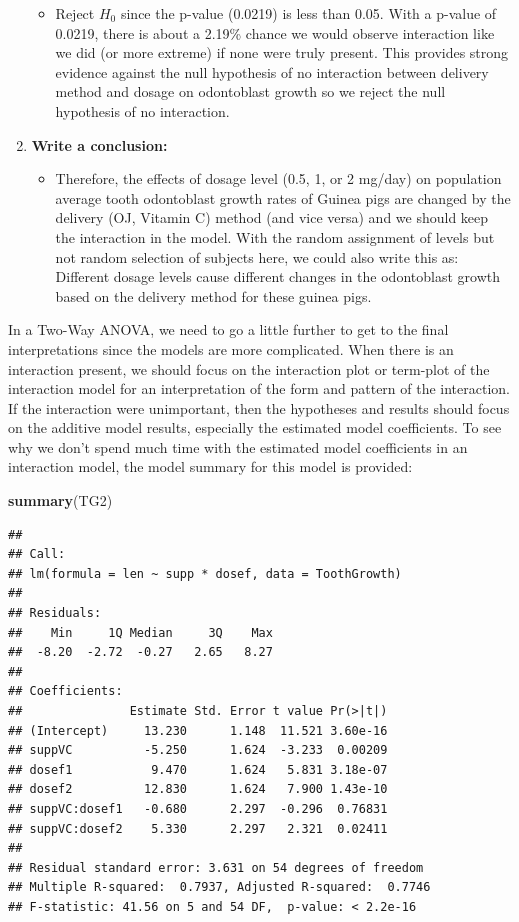 \documentclass[]{book}
\newenvironment{Shaded}{\begin{snugshade}}{\end{snugshade}}
\newcommand{\KeywordTok}[1]{\textcolor[rgb]{0.13,0.29,0.53}{\textbf{#1}}}
\newcommand{\NormalTok}[1]{#1}
\providecommand{\tightlist}{%
  \setlength{\itemsep}{0pt}\setlength{\parskip}{0pt}}
\theoremstyle{definition}
\theoremstyle{definition}
\theoremstyle{remark}
\begin{document}
\begin{enumerate}
  \begin{itemize}
  \tightlist
  \item
    Reject \(H_0\) since the p-value (0.0219) is less than 0.05. With a
    p-value of 0.0219, there is about a 2.19\% chance we would observe
    interaction like we did (or more extreme) if none were truly
    present. This provides strong evidence against the null hypothesis
    of no interaction between delivery method and dosage on odontoblast
    growth so we reject the null hypothesis of no interaction.
  \end{itemize}
\item
  \textbf{Write a conclusion:}

  \begin{itemize}
  \tightlist
  \item
    Therefore, the effects of dosage level (0.5, 1, or 2 mg/day) on
    population average tooth odontoblast growth rates of Guinea pigs are
    changed by the delivery (OJ, Vitamin C) method (and vice versa) and
    we should keep the interaction in the model. With the random
    assignment of levels but not random selection of subjects here, we
    could also write this as: Different dosage levels cause different
    changes in the odontoblast growth based on the delivery method for
    these guinea pigs.
  \end{itemize}
\end{enumerate}

In a Two-Way ANOVA, we need to go a little further to get to the final
interpretations since the models are more complicated. When there is an
interaction present, we should focus on the interaction plot or
term-plot of the interaction model for an interpretation of the form and
pattern of the interaction. If the interaction were unimportant, then
the hypotheses and results should focus on the additive model results,
especially the estimated model coefficients. To see why we don't spend
much time with the estimated model coefficients in an interaction model,
the model summary for this model is provided:

\begin{Shaded}
\begin{Highlighting}[]
\KeywordTok{summary}\NormalTok{(TG2)}
\end{Highlighting}
\end{Shaded}

\begin{verbatim}
## 
## Call:
## lm(formula = len ~ supp * dosef, data = ToothGrowth)
## 
## Residuals:
##    Min     1Q Median     3Q    Max 
##  -8.20  -2.72  -0.27   2.65   8.27 
## 
## Coefficients:
##               Estimate Std. Error t value Pr(>|t|)
## (Intercept)     13.230      1.148  11.521 3.60e-16
## suppVC          -5.250      1.624  -3.233  0.00209
## dosef1           9.470      1.624   5.831 3.18e-07
## dosef2          12.830      1.624   7.900 1.43e-10
## suppVC:dosef1   -0.680      2.297  -0.296  0.76831
## suppVC:dosef2    5.330      2.297   2.321  0.02411
## 
## Residual standard error: 3.631 on 54 degrees of freedom
## Multiple R-squared:  0.7937, Adjusted R-squared:  0.7746 
## F-statistic: 41.56 on 5 and 54 DF,  p-value: < 2.2e-16
\end{verbatim}
\end{document}
